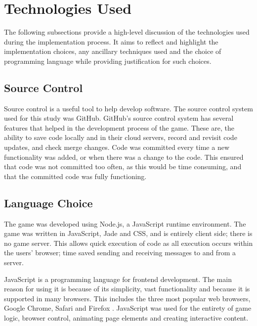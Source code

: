 \documentclass[a4paper,11.5pt]{report}
\numberwithin{figure}{section}
\numberwithin{table}{section}
\numberwithin{equation}{section}
\numberwithin{equation}{section}
\begin{document}


\section{Technologies Used}

The following subsections provide a high-level discussion of the technologies used during the implementation process. It aims to reflect and highlight the implementation choices, any ancillary techniques used and the choice of programming language while providing justification for such choices.

\subsection{Source Control}

Source control is a useful tool to help develop software. The source control system used for this study was GitHub. GitHub's source control system has several features that helped in the development process of the game. These are, the ability to save code locally and in their cloud servers, record and revisit code updates, and check merge changes. Code was committed every time a new functionality was added, or when there was a change to the code. This ensured that code was not committed too often, as this would be time consuming, and that the committed code was fully functioning.

\subsection{Language Choice}

The game was developed using Node.js, a JavaScript runtime environment. The game was written in JavaScript, Jade and CSS, and is entirely client side; there is no game server. This allows quick execution of code as all execution occurs within the users' browser; time saved sending and receiving messages to and from a server.

JavaScript is a programming language for frontend development. The main reason for using it is because of its simplicity, vast functionality and because it is supported in many browsers. This includes the three most popular web browsers, Google Chrome, Safari and Firefox \citep{statistabrowser}. JavaScript was used for the entirety of game logic, browser control, animating page elements and creating interactive content.
\end{document}
